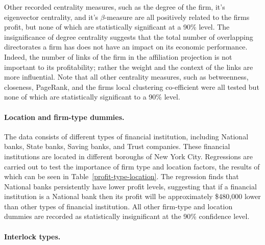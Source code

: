 Other recorded centrality measures, such as the degree of the firm, it's eigenvector centrality, and it's $\beta$-measure are all positively related to the firms profit, but none of which are statistically significant at a 90\% level. The insignificance of degree centrality suggests that the total number of overlapping directorates a firm has does not have an impact on its economic performance. Indeed, the number of links of the firm in the affiliation projection is not important to its profitability; rather the weight and the context of the links are more influential. Note that all other centrality measures, such as betweenness, closeness, PageRank, and the firms local clustering co-efficient were all tested but none of which are statistically significant to a 90\% level.

\paragraph{Location and firm-type dummies.}

The data consists of different types of financial institution, including National banks, State banks, Saving banks, and Trust companies. These financial institutions are located in different boroughs of New York City. Regressions are carried out to test the importance of firm type and location factors, the results of which can be seen in Table~\ref{profit-type-location}. The regression finds that National banks persistently have lower profit levels, suggesting that if a financial institution is a National bank then its profit will be approximately \$480,000 lower than other types of financial institution. All other firm-type and location dummies are recorded as statistically insignificant at the 90\% confidence level.

\paragraph{Interlock types.}

